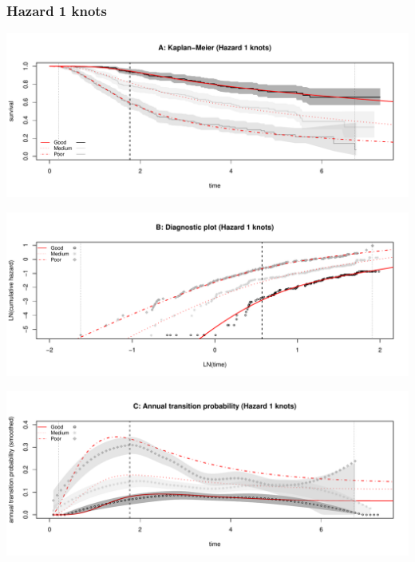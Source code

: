 \documentclass[
]{article}
\begin{document}
\clearpage

\clearpage

\subsubsection{Hazard 1 knots}\label{hazard-1-knots}

\begin{flushleft}\includegraphics[height=0.25\textheight]{BC_OS_output/Images/Figure_spline_models-1} \end{flushleft}

\begin{flushleft}\includegraphics[height=0.25\textheight]{BC_OS_output/Images/Figure_spline_models-2} \end{flushleft}

\begin{flushleft}\includegraphics[height=0.25\textheight]{BC_OS_output/Images/Figure_spline_models-3} \end{flushleft}
\end{document}

